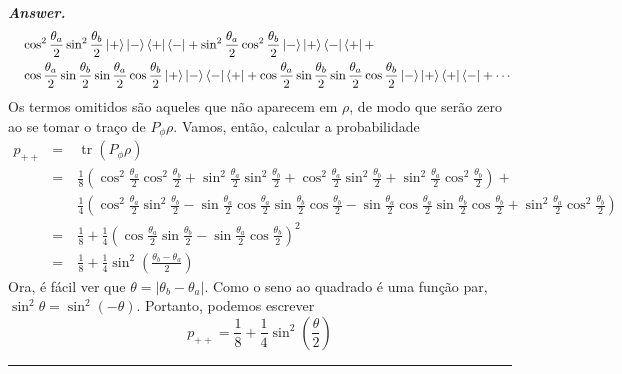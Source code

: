 \documentclass[12pt]{article}
\def\be{\begin{equation}}
\def\ee{\end{equation}}
\def\bea{\begin{eqnarray*}}
\def\eea{\end{eqnarray*}}
\def\f{\frac}
\def\l{\left}
\def\r{\right}
\newenvironment{answer}{\noindent\textbf{\textit{Answer.}} \normalfont }{\par\noindent\rule{\textwidth}{0.4pt}}
\DeclareMathOperator{\tr}{tr}
\begin{document}
\begin{answer}
\begin{align*}
			&\quad
			\cos^2\frac{\theta_a}{2}\sin^2\frac{\theta_b}{2}\ket{+}\ket{-}\bra{+}\bra{-} 
			+ \sin^2\frac{\theta_a}{2}\cos^2\frac{\theta_b}{2}\ket{-}\ket{+}\bra{-}\bra{+} + \\
			&\quad \cos\f{\theta_a}{2}\sin\f{\theta_b}{2}\sin\f{\theta_a}{2}\cos\f{\theta_b}{2} \ket{+}\ket{-}\bra{-}\bra{+} + \cos\f{\theta_a}{2}\sin\f{\theta_b}{2}\sin\f{\theta_a}{2}\cos\f{\theta_b}{2} \ket{-}\ket{+}\bra{+}\bra{-} + \cdots
		\end{align*}
		Os termos omitidos são aqueles que não aparecem em $\rho$, de modo que serão zero ao se tomar o traço de $P_\phi\rho$. Vamos, então, calcular a probabilidade
		\bea
			p_{++} &=& \tr\l( P_\phi\rho\r) \\
				&=& \f{1}{8}\l( \cos^2\frac{\theta_a}{2}\cos^2\frac{\theta_b}{2} + \sin^2\frac{\theta_a}{2}\sin^2\frac{\theta_b}{2} + 
				\cos^2\frac{\theta_a}{2}\sin^2\frac{\theta_b}{2} + \sin^2\frac{\theta_a}{2}\cos^2\frac{\theta_b}{2} \r) + \\
				&\quad& \f{1}{4}\l( \cos^2\f{\theta_a}{2}\sin^2\f{\theta_b}{2} - \sin\f{\theta_a}{2}\cos\f{\theta_a}{2}\sin\f{\theta_b}{2}\cos\f{\theta_b}{2} - \sin\f{\theta_a}{2}\cos\f{\theta_a}{2}\sin\f{\theta_b}{2}\cos\f{\theta_b}{2} + \sin^2\frac{\theta_a}{2}\cos^2\frac{\theta_b}{2} \r) \\
				&=& \f{1}{8} + \f{1}{4}\l( \cos\f{\theta_a}{2}\sin\f{\theta_b}{2} - \sin\f{\theta_a}{2}\cos\f{\theta_b}{2} \r)^2 \\
				&=& \f{1}{8} + \f{1}{4}\sin^2\l(\f{\theta_b - \theta_a}{2}\r)
		\eea
		Ora, é fácil ver que $\theta=|\theta_b-\theta_a|$. Como o seno ao quadrado é uma função par, $\sin^2\theta = \sin^2(-\theta)$. Portanto, podemos escrever
		\be
			p_{++} = \f{1}{8} + \f{1}{4}\sin^2\l(\f{\theta}{2}\r)
		\ee
	\end{answer}
	
\end{document}
